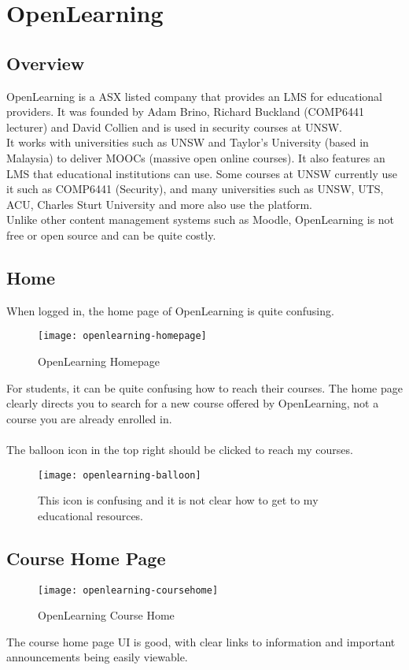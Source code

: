 
\section{OpenLearning}
\subsection{Overview}
OpenLearning is a ASX listed company that provides an LMS for educational providers. It was founded by Adam Brino, Richard Buckland (COMP6441 lecturer) and David Collien and is used in security courses at UNSW\cite{openlearning}.\\
It works with universities such as UNSW and Taylor's University (based in Malaysia) to deliver MOOCs (massive open online courses). It also features an LMS that educational institutions can use. Some courses at UNSW currently use it such as COMP6441 (Security), and many universities such as UNSW, UTS, ACU, Charles Sturt University and more also use the platform.\\
Unlike other content management systems such as Moodle, OpenLearning is not free or open source and can be quite costly\cite{openlearningPricing}.\\

\subsection{Home}
When logged in, the home page of OpenLearning is quite confusing.\\
\begin{figure}[h!]
    \centering
    \texttt{[image: openlearning-homepage]}
    \caption{OpenLearning Homepage}
\end{figure}

For students, it can be quite confusing how to reach their courses. The home page clearly directs you to search for a new course offered by OpenLearning, not a course you are already enrolled in. \\
\\
The balloon icon in the top right should be clicked to reach my courses. \\
\begin{figure}[h!]
    \centering
    \texttt{[image: openlearning-balloon]}
    \caption{This icon is confusing and it is not clear how to get to my educational resources.}
\end{figure}

\subsection{Course Home Page}
\begin{figure}[h!]
    \centering
    \texttt{[image: openlearning-coursehome]}
    \caption{OpenLearning Course Home}
\end{figure}
The course home page UI is good, with clear links to information and important announcements being easily viewable.\\


